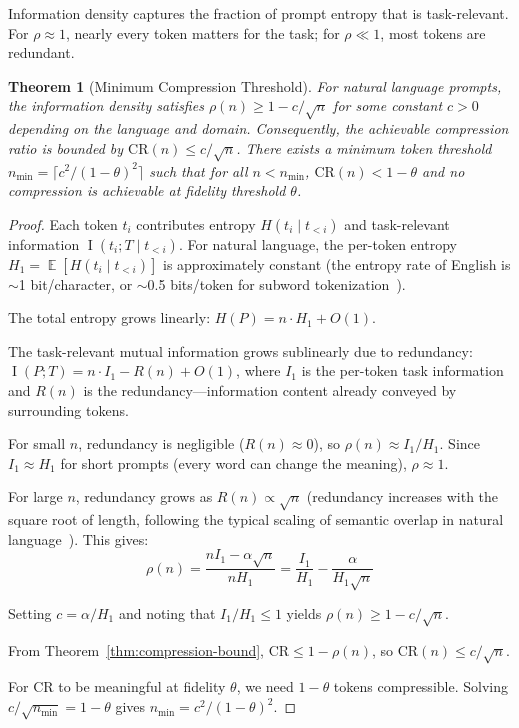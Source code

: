 \documentclass[11pt]{article}
\newtheorem{theorem}{Theorem}[section]
\theoremstyle{remark}
\DeclareMathOperator{\E}{\mathbb{E}}
\DeclareMathOperator{\MI}{I}
\begin{document}
Information density captures the fraction of prompt entropy that is
task-relevant. For $\rho \approx 1$, nearly every token matters for the
task; for $\rho \ll 1$, most tokens are redundant.

\begin{theorem}[Minimum Compression Threshold]
\label{thm:min-threshold}
For natural language prompts, the information density satisfies
$\rho(n) \geq 1 - c / \sqrt{n}$ for some constant $c > 0$ depending on
the language and domain. Consequently, the achievable compression ratio
is bounded by $\text{CR}(n) \leq c / \sqrt{n}$. There exists a minimum
token threshold $n_{\min} = \lceil c^2 / (1-\theta)^2 \rceil$ such that
for all $n < n_{\min}$, $\text{CR}(n) < 1 - \theta$ and no compression
is achievable at fidelity threshold $\theta$.
\end{theorem}

\begin{proof}
Each token $t_i$ contributes entropy $H(t_i \mid t_{<i})$ and
task-relevant information $\MI(t_i; T \mid t_{<i})$. For natural language,
the per-token entropy $H_1 = \E[H(t_i \mid t_{<i})]$ is approximately
constant (the entropy rate of English is $\sim$1 bit/character, or
$\sim$0.5 bits/token for subword tokenization~\cite{shannon1948}).

The total entropy grows linearly: $H(P) = n \cdot H_1 + O(1)$.

The task-relevant mutual information grows sublinearly due to redundancy:
$\MI(P; T) = n \cdot I_1 - R(n) + O(1)$, where $I_1$ is the per-token
task information and $R(n)$ is the redundancy---information content
already conveyed by surrounding tokens.

For small $n$, redundancy is negligible ($R(n) \approx 0$), so
$\rho(n) \approx I_1 / H_1$. Since $I_1 \approx H_1$ for short prompts
(every word can change the meaning), $\rho \approx 1$.

For large $n$, redundancy grows as $R(n) \propto \sqrt{n}$ (redundancy
increases with the square root of length, following the typical scaling
of semantic overlap in natural language~\cite{cover2006}). This gives:
\begin{equation}
    \rho(n) = \frac{n I_1 - \alpha\sqrt{n}}{n H_1}
    = \frac{I_1}{H_1} - \frac{\alpha}{H_1\sqrt{n}}
\end{equation}

Setting $c = \alpha / H_1$ and noting that $I_1 / H_1 \leq 1$ yields
$\rho(n) \geq 1 - c / \sqrt{n}$.

From Theorem~\ref{thm:compression-bound}, $\text{CR} \leq 1 - \rho(n)$,
so $\text{CR}(n) \leq c / \sqrt{n}$.

For CR to be meaningful at fidelity $\theta$, we need $1 - \theta$ tokens
compressible. Solving $c / \sqrt{n_{\min}} = 1 - \theta$ gives
$n_{\min} = c^2 / (1-\theta)^2$.
\end{proof}
\end{document}
